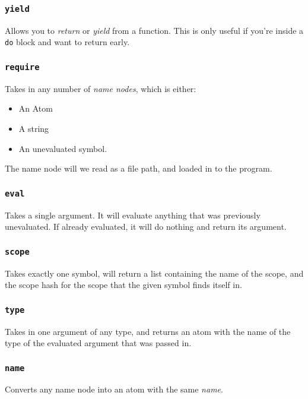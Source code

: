 \documentclass{article}
\newcommand{\code}[1]{\texttt{#1}}
\begin{document}
    \subsubsection{\code{yield}}
      Allows you to \emph{return} or \emph{yield} from a function.
      This is only useful if you're inside a \code{do} block and want
      to return early.

    \subsubsection{\code{require}}
      Takes in any number of \emph{name nodes}, which is either:
      \begin{itemize}
        \item An Atom
        \item A string
        \item An unevaluated symbol.
      \end{itemize}

      The name node will we read as a file path, and loaded in to the program.

    \subsubsection{\code{eval}}
      Takes a single argument.  It will evaluate anything that was
      previously unevaluated. If already evaluated, it will do nothing and
      return its argument.

    \subsubsection{\code{scope}}
      Takes exactly one symbol, will return a list containing the name of the
      scope, and the scope hash for the scope that the given symbol finds
      itself in.

    \subsubsection{\code{type}}
      Takes in one argument of any type, and returns an atom with the name
      of the type of the evaluated argument that was passed in.

    \subsubsection{\code{name}}
      Converts any name node into an atom with the same \emph{name}.
\end{document}
